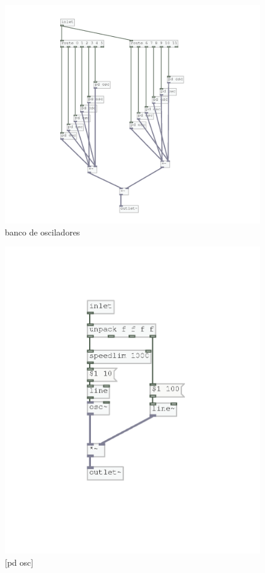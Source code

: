 \documentclass[draft]{ppgmus}
\begin{document}
\begin{figure}
\includegraphics[scale=.7]{banco-osc}
\caption{banco de osciladores}
\label{bancoosc}
\end{figure}

\begin{figure}
\includegraphics[scale=.7]{osc-base}
\caption{[pd osc]}
\label{pdosc}
\end{figure}
\end{document}
